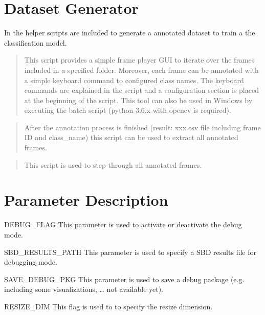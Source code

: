 \documentclass[letterpaper,10pt,english,openany,oneside]{sphinxmanual}
\begin{document}
\chapter{Dataset Generator}
\label{\detokenize{index:dataset-generator}}
In the  helper scripts are included to generate a annotated dataset to train
a the classification model.

\begin{quote}

This script provides a simple frame player GUI to iterate over the frames included in a specified folder. Moreover,
each frame can be annotated with a simple keyboard command to configured class names. The keyboard commands are
explained in the script and a configuration section is placed at the beginning of the script. This tool can also be
used in Windows by executing the batch script (python 3.6.x with opencv is required).
\end{quote}

\begin{quote}

After the annotation process is finished (result: xxx.csv file including frame ID and class\_name) this script can be
used to extract all annotated frames.
\end{quote}

\begin{quote}

This script is used to step through all annotated frames.
\end{quote}


\chapter{Parameter Description}
\label{\detokenize{index:parameter-description}}
DEBUG\_FLAG
This parameter is used to activate or deactivate the debug mode.



SBD\_RESULTS\_PATH
This parameter is used to specify a SBD results file for debugging mode.



SAVE\_DEBUG\_PKG
This parameter is used to save a debug package (e.g. including some visualizations, … \sphinxhyphen{} not available yet).



RESIZE\_DIM
This flag is used to to specify the resize dimension.
\end{document}
